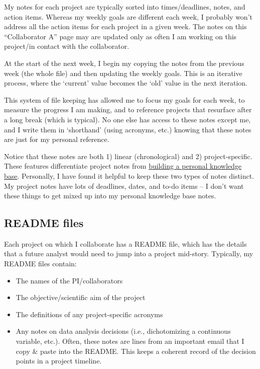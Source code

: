 \documentclass[
]{book}
\begin{document}
My notes for each project are typically sorted into times/deadlines, notes, and action items. Whereas my weekly goals are different each week, I probably won't address all the action items for each project in a given week. The notes on this ``Collaborator A'' page may are updated only as often I am working on this project/in contact with the collaborator.

At the start of the next week, I begin my copying the notes from the previous week (the whole file) and then updating the weekly goals. This is an iterative process, where the `current' value becomes the `old' value in the next iteration.

This system of file keeping has allowed me to focus my goals for each week, to measure the progress I am making, and to reference projects that resurface after a long break (which is typical). No one else has access to these notes except me, and I write them in `shorthand' (using acronyms, etc.) knowing that these notes are just for my personal reference.

Notice that these notes are both 1) linear (chronological) and 2) project-specific. These features differentiate project notes from \protect\hyperlink{zettelkasten}{building a personal knowledge base}. Personally, I have found it helpful to keep these two types of notes distinct. My project notes have lots of deadlines, dates, and to-do items -- I don't want these things to get mixed up into my personal knowledge base notes.

\hypertarget{readme}{%
\subsection{README files}\label{readme}}

Each project on which I collaborate has a README file, which has the details that a future analyst would need to jump into a project mid-story. Typically, my README files contain:

\begin{itemize}
\item
  The names of the PI/collaborators
\item
  The objective/scientific aim of the project
\item
  The definitions of any project-specific acronyms
\item
  Any notes on data analysis decisions (i.e., dichotomizing a continuous variable, etc.). Often, these notes are lines from an important email that I copy \& paste into the README. This keeps a coherent record of the decision points in a project timeline.
\end{itemize}
\end{document}
